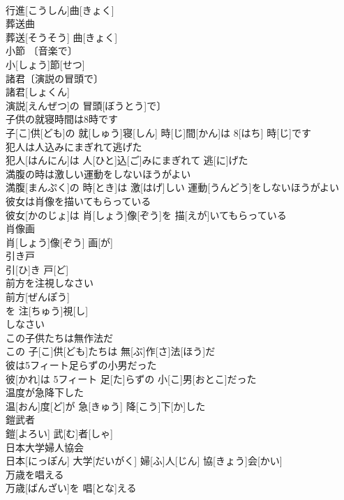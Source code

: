 \documentclass[8pt]{extreport}
\begin{document}
\begin{CJK}{UTF8}{min}
\\	行進[こうしん]曲[きょく]
\\	葬送曲	
\\	葬送[そうそう] 曲[きょく]
\\	小節	〔音楽で〕
\\	小[しょう]節[せつ]
\\	諸君〔演説の冒頭で〕	
\\	諸君[しょくん]
\\	演説[えんぜつ]の 冒頭[ぼうとう]で〕
\\	子供の就寝時間は8時です	
\\	子[こ]供[ども]の 就[しゅう]寝[しん] 時[じ]間[かん]は 8[はち] 時[じ]です
\\	犯人は人込みにまぎれて逃げた	
\\	犯人[はんにん]は 人[ひと]込[ご]みにまぎれて 逃[に]げた
\\	満腹の時は激しい運動をしないほうがよい	
\\	満腹[まんぷく]の 時[とき]は 激[はげ]しい 運動[うんどう]をしないほうがよい
\\	彼女は肖像を描いてもらっている	
\\	彼女[かのじょ]は 肖[しょう]像[ぞう]を 描[えが]いてもらっている
\\	肖像画	
\\	肖[しょう]像[ぞう] 画[が]
\\	引き戸	
\\	引[ひ]き 戸[ど]
\\	前方を注視しなさい	
\\	前方[ぜんぽう]
\\	を 注[ちゅう]視[し]
\\	しなさい
\\	この子供たちは無作法だ	
\\	この 子[こ]供[ども]たちは 無[ぶ]作[さ]法[ほう]だ
\\	彼は5フィート足らずの小男だった	
\\	彼[かれ]は 5フィート 足[た]らずの 小[こ]男[おとこ]だった
\\	温度が急降下した	
\\	温[おん]度[ど]が 急[きゅう] 降[こう]下[か]した
\\	鎧武者	
\\	鎧[よろい] 武[む]者[しゃ]
\\	日本大学婦人協会	
\\	日本[にっぽん] 大学[だいがく] 婦[ふ]人[じん] 協[きょう]会[かい]
\\	万歳を唱える	
\\	万歳[ばんざい]を 唱[とな]える

\end{CJK}
\end{document}
